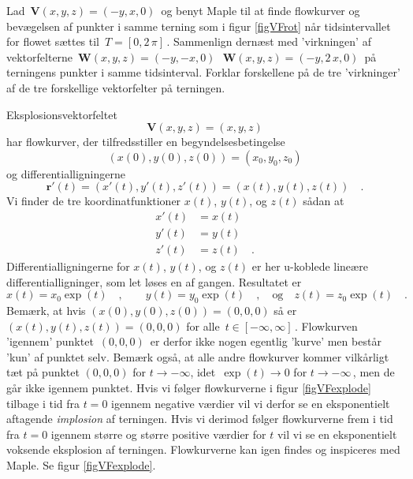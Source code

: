 \begin{exercise} \label{exerFlowDeform}
Lad $\,{\mathbf{V}}(x,y,z) = (-y, x, 0)\,$ og benyt Maple
til at finde flowkurver og bevægelsen af punkter i samme terning som i figur
\ref{figVFrot} når tidsintervallet for flowet sættes til $\,T = [0,
2\,\pi]\,$. Sammenlign dernæst med 'virkningen' af vektorfelterne
$\,{\mathbf{W}}(x,y,z) = (-y, -x, 0)\,$  $\,{\mathbf{W}}(x,y,z) = (-y, 2\,x, 0)\,$ på terningens punkter i samme
tidsinterval. Forklar forskellene på de tre 'virkninger' af de tre
forskellige vektorfelter på terningen.
\end{exercise}



\begin{example}\label{exVFexplodeFlow}
Eksplosionsvektorfeltet
\begin{equation}
{\mathbf{V}}(x,y,z) = (x, y, z)
\end{equation}
har flowkurver, der tilfredsstiller en begyndelsesbetingelse
\begin{equation}
(x(0), y(0), z(0)) = (x_{0},
y_{0}, z_{0})
\end{equation}
og differentialligningerne
\begin{equation}
{\mathbf{r}}'(t) = (x'(t),
y'(t), z'(t)) = (x(t), y(t), z(t)) \quad .
\end{equation}
Vi  finder de tre koordinatfunktioner  $x(t)$, $y(t)$, og $z(t)$ sådan at
\begin{equation}
\begin{aligned}
x'(t) &= x(t) \\
y'(t) &=  y(t) \\
z'(t) &=  z(t) \quad .
\end{aligned}
\end{equation}
 Differentialligningerne
for $x(t)$, $y(t)$, og $z(t)$ er her u-koblede lineære
differentialligninger, som let løses en af gangen. Resultatet er
\begin{equation}
x(t) = x_{0}\exp(t)\quad , \qquad
y(t) = y_{0}\exp(t)\quad , \quad \textrm{og}
\quad z(t) = z_{0}\exp(t) \quad .
\end{equation}
 Bemærk, at
hvis $(x(0), y(0), z(0)) = (0,0,0)$ så er $(x(t),
y(t), z(t)) = (0,0,0)$ for alle $\, t \in
[-\infty, \infty] \,$. Flowkurven 'igennem'
punktet $\,(0,0,0)\,$ er derfor ikke nogen
egentlig 'kurve' men består 'kun' af punktet
selv. Bemærk også, at alle andre flowkurver
kommer vilkårligt tæt på punktet $(0,0,0)$ for $t
\to -\infty$, idet $\,\exp(t) \to 0$ for $t \to
-\infty\,$, men de går ikke igennem punktet. Hvis
vi følger flowkurverne i figur \ref{figVFexplode}
tilbage i tid fra $t = 0$ igennem negative
værdier vil vi derfor se en eksponentielt
aftagende {\em{{implosion}}} af terningen. Hvis vi
derimod følger flowkurverne frem i tid fra $t =
0$ igennem større og større positive værdier for
$t$ vil vi se en eksponentielt voksende
eks\-plo\-sion af terningen. Flowkurverne kan
igen findes og inspiceres med
Maple. Se figur
\ref{figVFexplode}.\\


\end{example}
